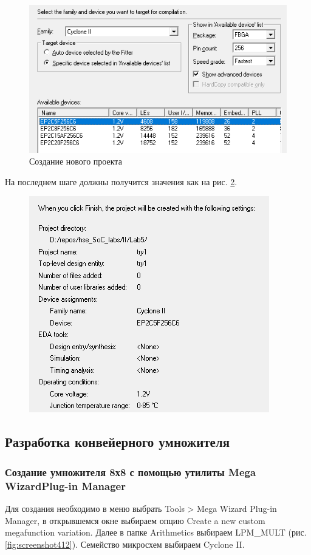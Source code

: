 \documentclass[a4paper,14pt]{article}
\begin{document}
\begin{figure}[H]
	\centering
	\includegraphics[width=0.7\linewidth]{image/lab5/Screenshot_42}
	\caption{Создание нового проекта}
	\label{fig:screenshot42}
\end{figure}

На последнем шаге должны получится значения как на рис. \ref{fig:screenshot43}.

\begin{figure}[H]
	\centering
	\includegraphics[width=0.7\linewidth]{image/lab5/Screenshot_43}
	\caption{}
	\label{fig:screenshot43}
\end{figure}

\subsection{Разработка конвейерного умножителя}

\subsubsection{Создание умножителя 8х8 с помощью утилиты Mega Wizard\textregistered  Plug-in Manager}

Для создания необходимо в меню выбрать Tools > Mega Wizard  Plug-in Manager, в открывшемся окне выбираем опцию Create a new custom megafunction variation. Далее в папке Arithmetics выбираем LPM\_MULT (рис. \ref{fig:screenshot412}). Семейство микросхем выбираем Cyclone II.
\end{document}
